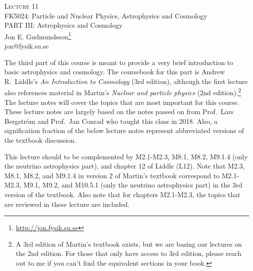 \documentclass[a4paper,12pt]{article}
\theoremstyle{remark}
\renewcommand{\=}[1]{\stackrel{#1}{=}} %
\newcommand{\linkc}[1]{\textcolor{linkc}{#1}}
\theoremstyle{plain}
\theoremstyle{definition}
\begin{document}
\fontsize{5mm}{6mm}\selectfont

\thispagestyle{empty}
\begin{center}
\textsc{Lecture 11}\\[1.5ex]
{\Huge FK5024: Particle and Nuclear Physics, Astrophysics and Cosmology\\}
\vspace{3mm}
{\large PART III: Astrophysics and Cosmology \\}
Jon E. Gudmundsson\footnote{\href{http://jon.fysik.su.se}{\linkc{http://jon.fysik.su.se}}} \\
\linkc{jon@fysik.su.se}
\end{center}

The third part of this course is meant to provide a very brief introduction to basic astrophysics and cosmology. The coursebook for this part is Andrew R.\ Liddle's \textit{An Introduction to Cosmology} (3rd edition), although the first lecture also references material in Martin's \textit{Nuclear and particle physics} (2nd edition).\footnote{A 3rd edition of Martin's textbook exists, but we are basing our lectures on the 2nd edition. For those that only have access to 3rd edition, please reach out to me if you can't find the equivalent sections in your book.} The lecture notes will cover the topics that are most important for this course. These lecture notes are largely based on the notes passed on from Prof.\ Lars Bergström and Prof.\ Jan Conrad who taught this class in 2018. Also, a signification fraction of the below lecture notes represent abbreviated versions of the textbook discussion.

\begin{attention}
This lecture should to be complemented by M2.1-M2.3, M8.1, M8.2, M9.1.4 (only the neutrino astrophysics part), and chapter 12 of Liddle (L12). Note that M2.3, M8.1, M8.2, and M9.1.4 in version 2 of Martin's textbook correspond to M2.1-M2.3, M9.1, M9.2, and M10.5.1 (only the neutrino astrophysics part) in the 3rd version of the textbook. Also note that for chapters M2.1-M2.3, the topics that are reviewed in these lecture are included.
\end{attention}
\end{document}
